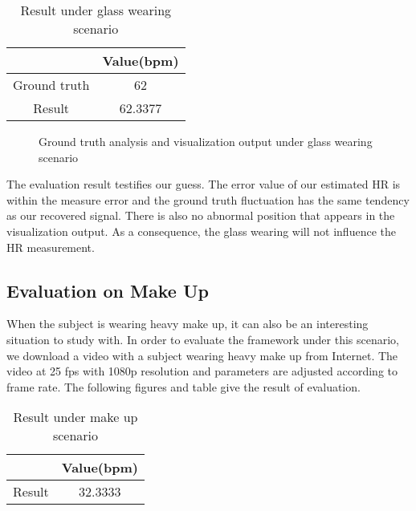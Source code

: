 \begin{table}[htbp]
\centering
\caption{Result under glass wearing scenario} \label{tab:simpletable}
\begin{tabular}{|c|c|}
    \hline
     & Value(bpm) \\
    \hline
    Ground truth & 62 \\
    \hline
    Result & 62.3377 \\
    \hline
\end{tabular}
\end{table}


\begin{figure}[ht]
\hspace{-0.3in}
\caption{Ground truth analysis and visualization output under glass wearing scenario}\label{fig:noted-figure}
\end{figure}

The evaluation result testifies our guess. The error value of our estimated HR is within the measure error and the ground truth fluctuation has the same tendency as our recovered signal. There is also no abnormal position that appears in the visualization output. As a consequence, the glass wearing will not influence the HR measurement.

\subsection{Evaluation on Make Up}
When the subject is wearing heavy make up, it can also be an interesting situation to study with. In order to evaluate the framework under this scenario, we download a video with a subject wearing heavy make up from Internet. The video at 25 fps with 1080p resolution and parameters are adjusted according to frame rate. The following figures and table give the result of evaluation.



\begin{table}[htbp]
\centering
\caption{Result under make up scenario} \label{tab:simpletable}
\begin{tabular}{|c|c|}
    \hline
     & Value(bpm) \\
    \hline
    Result & 32.3333 \\
    \hline
\end{tabular}
\end{table}


